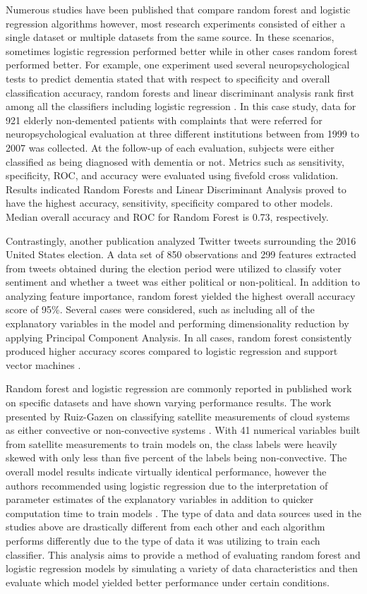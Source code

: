 \documentclass{llncs}
\begin{document}
Numerous studies have been published that compare random forest and logistic regression algorithms however, most research experiments consisted of either a single dataset or multiple datasets from the same source. In these scenarios, sometimes logistic regression performed better while in other cases random forest performed better. For example, one experiment used several neuropsychological tests to predict dementia stated that with respect to specificity and overall classification accuracy, random forests and linear discriminant analysis rank first among all the classifiers including logistic regression \cite{guerreiro}. In this case study, data for 921 elderly non-demented patients with complaints that were referred for neuropsychological evaluation at three different institutions between from 1999 to 2007 was collected. At the follow-up of each evaluation, subjects were either classified as being diagnosed with dementia or not. Metrics such as sensitivity, specificity, ROC, and accuracy were evaluated using fivefold cross validation. Results indicated Random Forests and Linear Discriminant Analysis proved to have the highest accuracy, sensitivity, specificity compared to other models. Median overall accuracy and ROC for Random Forest is 0.73, respectively.   

Contrastingly, another publication analyzed Twitter tweets surrounding the 2016 United States election. A data set of 850 observations and 299 features extracted from tweets obtained during the election period were utilized to classify voter sentiment and whether a tweet was either political or non-political. In addition to analyzing feature importance, random forest yielded the highest overall accuracy score of 95\%. Several cases were considered, such as including all of the explanatory variables in the model and performing dimensionality reduction by applying Principal Component Analysis. In all cases, random forest consistently produced higher accuracy scores compared to logistic regression and support vector machines \cite{erdem}. 

Random forest and logistic regression are commonly reported in published work on specific datasets and have shown varying performance results. The work presented by Ruiz-Gazen on classifying satellite measurements of cloud systems as either convective or non-convective systems \cite{ruiz}. With 41 numerical variables built from satellite measurements to train models on, the class labels were heavily skewed with only less than five percent of the labels being non-convective. The overall model results indicate virtually identical performance, however the authors recommended using logistic regression due to the interpretation of parameter estimates of the explanatory variables in addition to quicker computation time to train models \cite{ruiz}. The type of data and data sources used in the studies above are drastically different from each other and each algorithm performs differently due to the type of data it was utilizing to train each classifier. This analysis aims to provide a method of evaluating random forest and logistic regression models by simulating a variety of data characteristics and then evaluate which model yielded better performance under certain conditions.
\end{document}
